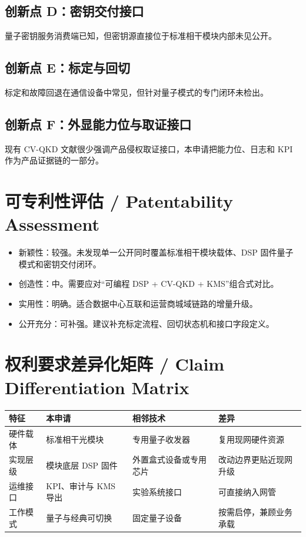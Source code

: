 ﻿\documentclass[12pt,a4paper]{article}
\begin{document}
\subsection{创新点 D：密钥交付接口}
量子密钥服务消费端已知，但密钥源直接位于标准相干模块内部未见公开。

\subsection{创新点 E：标定与回切}
标定和故障回退在通信设备中常见，但针对量子模式的专门闭环未检出。

\subsection{创新点 F：外显能力位与取证接口}
现有 CV-QKD 文献很少强调产品侵权取证接口，本申请把能力位、日志和 KPI 作为产品证据链的一部分。

\section{可专利性评估 / Patentability Assessment}
\begin{itemize}
\item 新颖性：较强。未发现单一公开同时覆盖标准相干模块载体、DSP 固件量子模式和密钥交付闭环。
\item 创造性：中。需要应对“可编程 DSP + CV-QKD + KMS”组合式对比。
\item 实用性：明确。适合数据中心互联和运营商城域链路的增量升级。
\item 公开充分：可补强。建议补充标定流程、回切状态机和接口字段定义。
\end{itemize}

\section{权利要求差异化矩阵 / Claim Differentiation Matrix}
\begin{tabular}{|p{2.8cm}|p{3.8cm}|p{3.8cm}|p{2.8cm}|}
\hline
特征 & 本申请 & 相邻技术 & 差异 \\
\hline
硬件载体 & 标准相干光模块 & 专用量子收发器 & 复用现网硬件资源 \\
\hline
实现层级 & 模块底层 DSP 固件 & 外置盒式设备或专用芯片 & 改动边界更贴近现网升级 \\
\hline
运维接口 & KPI、审计与 KMS 导出 & 实验系统接口 & 可直接纳入网管 \\
\hline
工作模式 & 量子与经典可切换 & 固定量子设备 & 按需启停，兼顾业务承载 \\
\hline
\end{tabular}
\end{document}
